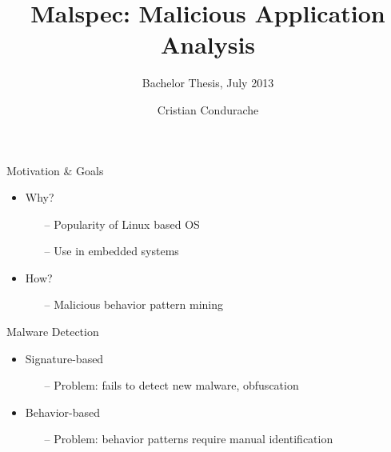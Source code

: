\documentclass{beamer}
\title{Malspec: Malicious Application Analysis}
\subtitle{Bachelor Thesis, July 2013}
\institute{As.dr.ing. Laura Gheorghe}
\author{Cristian Condurache}
\begin{document}
{
  \frame{\titlepage}
}

\begin{frame}{Motivation \& Goals}
  \begin{itemize}
    \item Why?
    \begin{itemize}
      \item[--] Popularity of Linux based OS
      \item[--] Use in embedded systems
    \end{itemize}
    \item How?
    \begin{itemize}
      \item[--] Malicious behavior pattern mining
    \end{itemize}
  \end{itemize}
\end{frame}

\begin{frame}{Malware Detection}
  \begin{itemize}
    \item Signature-based
    \begin{itemize}
      \item[--] Problem: fails to detect new malware, obfuscation
    \end{itemize}
    \item Behavior-based
    \begin{itemize}
      \item[--] Problem: behavior patterns require manual identification
    \end{itemize}
  \end{itemize}
\end{frame}
\end{document}
